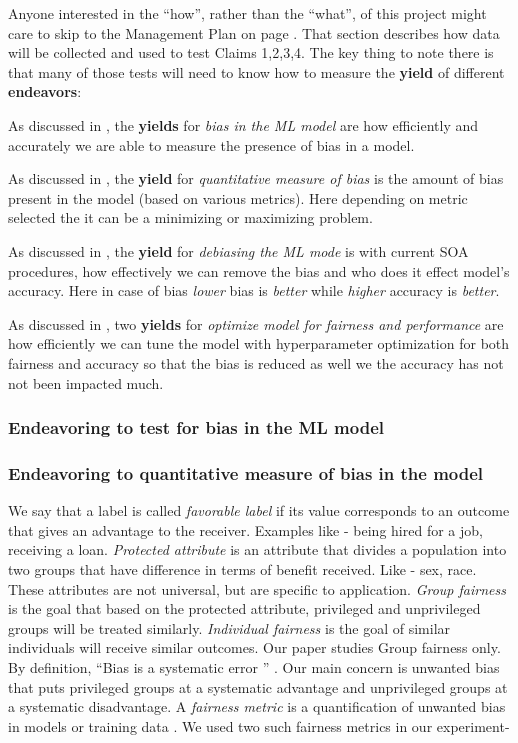Anyone  interested in the ``how'', rather than the ``what'', of this project
might care to skip to the Management Plan on page \pageref{tion:plan}. That section 
 describes how  data
will be collected  and used
to test Claims 1,2,3,4.  The key thing to note
there is that many of those
tests will need to know how to measure
the {\bf yield} of different {\bf endeavors}:
\bi
\item 
As discussed in , the {\bf yields} for {\em bias in the ML model} are how efficiently and accurately we are able to measure the presence of bias in a model.
\item 
As discussed in , the {\bf yield} for {\em quantitative measure of bias}
is the amount of bias present in the model (based on various metrics). Here depending on metric selected the it can be a minimizing or maximizing problem.
\item 
As discussed in , the {\bf yield} for {\em debiasing the ML mode} is with current SOA procedures, how effectively we can remove the bias and who does it effect model's accuracy. Here in case of bias {\em lower} bias is {\em better} while {\em higher} accuracy is {\em better}.
\item 
As discussed in ,  two {\bf yields} for {\em optimize model for fairness and performance} are how efficiently we can tune the model with hyperparameter optimization for both fairness and accuracy so that the bias is reduced as well we the accuracy has not not been impacted much.
\ei

\subsubsection{Endeavoring to test for bias in the ML model}\label{tion:test_bias}

\subsubsection{Endeavoring to quantitative measure of bias in the model}\label{tion:quantitative_measure}
We say that a label is called \textit{favorable label} if its  value corresponds to an outcome that gives an advantage to the receiver. Examples like - being hired for a job, receiving a loan. \textit{Protected attribute} is an attribute that divides a population into two groups that have difference in terms of benefit received. Like - sex, race. These attributes are not universal, but are specific to application. \textit{Group fairness} is the goal that based on the protected attribute, privileged and unprivileged groups will be treated similarly. \textit{Individual fairness} is the goal of similar individuals will receive similar outcomes.  Our paper studies Group fairness only.
By definition, ``Bias is a systematic error '' \cite{bias_systemetic}. Our main concern is unwanted bias that puts privileged groups at a systematic advantage and unprivileged groups at a systematic disadvantage. A \textit{fairness metric} is a quantification of unwanted bias in models or training data \cite{IBM}. We used two such fairness metrics in our experiment-

